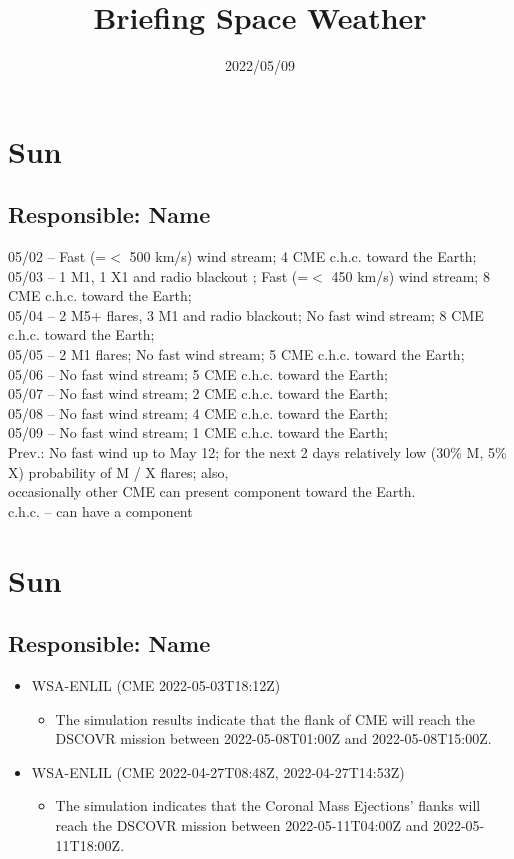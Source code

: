 \documentclass[a4paper, 10pt]{article}
\title{\Large{\textbf{Briefing Space Weather}}}
\date{2022/05/09}
\begin{document}
\maketitle 

  \thispagestyle{fancy} \section{Sun} 
 \subsection{Responsible: Name}

05/02 – Fast (=$<$ 500 km/s) wind stream; 4 CME c.h.c. toward the Earth; \\ 05/03 – 1 M1, 1 X1 and radio blackout ; Fast (=$<$ 450 km/s) wind stream; 8 CME c.h.c. toward the Earth; \\ 05/04 – 2 M5+ flares, 3 M1 and radio blackout; No fast wind stream; 8 CME c.h.c. toward the Earth; \\ 05/05 – 2 M1 flares; No fast wind stream; 5 CME c.h.c. toward the Earth; \\ 05/06 – No fast wind stream; 5 CME c.h.c. toward the Earth; \\ 05/07 – No fast wind stream; 2 CME c.h.c. toward the Earth; \\ 05/08 – No fast wind stream; 4 CME c.h.c. toward the Earth; \\ 05/09 – No fast wind stream; 1 CME c.h.c. toward the Earth; \\ Prev.: No fast wind up to May 12; for the next 2 days relatively low (30\% M, 5\% X) probability of M / X flares; also, \\ occasionally other CME can present component toward the Earth. \\ c.h.c. – can have a component\section{Sun} 
 \subsection{Responsible: Name}

\begin{itemize} 
 \item WSA-ENLIL (CME 2022-05-03T18:12Z)
\begin{itemize} 
 \item The simulation results indicate that the flank of CME will reach the DSCOVR mission between 2022-05-08T01:00Z and 2022-05-08T15:00Z.
\end{itemize} 
 \item WSA-ENLIL (CME 2022-04-27T08:48Z, 2022-04-27T14:53Z)
\begin{itemize} 
 \item The simulation indicates that the Coronal Mass Ejections’ flanks will reach the DSCOVR mission between 2022-05-11T04:00Z and 2022-05-11T18:00Z. 
\end{itemize} 
 \end{itemize} 
 
\end{document}
